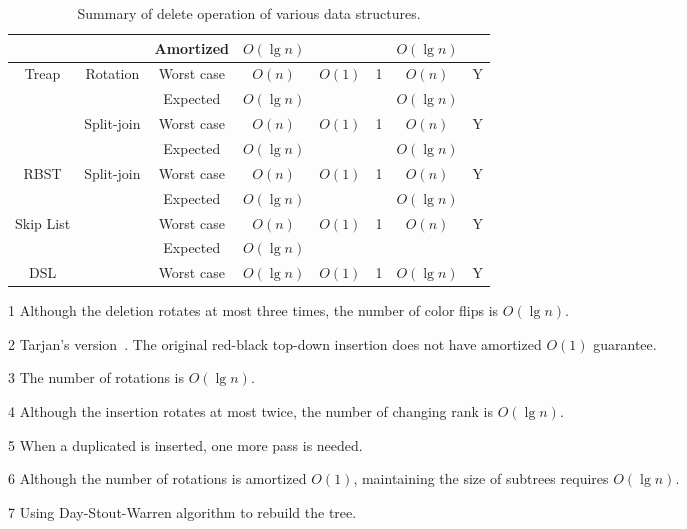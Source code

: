 \begin{table}[!t]
\begin{threeparttable}
\begin{tabular}{cccccccc}
  & & Amortized & $O(\lg n)$ & & & $O(\lg n)$ & \\
  \hline
  \multirow{4}{*}{Treap} & \multirow{2}{*}{Rotation} & Worst case & $O(n)$ & \multirow{2}{*}{$O(1)$} & \multirow{2}{*}{1} & $O(n)$ & \multirow{2}{*}{Y} \\
  & & Expected & $O(\lg n)$ &  & & $O(\lg n)$ & \\
  & \multirow{2}{*}{Split-join} & Worst case & $O(n)$ & \multirow{2}{*}{$O(1)$} & \multirow{2}{*}{1} & $O(n)$ & \multirow{2}{*}{Y} \\
  & & Expected & $O(\lg n)$ & & & $O(\lg n)$ & \\
  \hline
  \multirow{2}{*}{RBST} & \multirow{2}{*}{Split-join}& Worst case & $O(n)$ & \multirow{2}{*}{$O(1)$} & \multirow{2}{*}{1} & $O(n)$ & \multirow{2}{*}{Y} \\
  & & Expected & $O(\lg n)$ &  & & $O(\lg n)$ & \\
  \hline
  \multirow{2}{*}{Skip List} & & Worst case & $O(n)$ & \multirow{2}{*}{$O(1)$} & \multirow{2}{*}{1} & \multirow{2}{*}{$O(n)$} & \multirow{2}{*}{Y} \\
  & & Expected & $O(\lg n)$ & & & & \\
  \hline
  DSL & & Worst case & $O(\lg n)$ & $O(1)$ & 1 & $O(\lg n)$ & Y \\
\end{tabular}
\begin{tablenotes}\footnotesize
\item[1] Although the deletion rotates at most three times, the number of color flips is $O(\lg n)$.
\item[2] Tarjan's version~\cite{Tarjan1985}. The original red-black top-down insertion does not have amortized $O(1)$ guarantee.
\item[3] The number of rotations is $O(\lg n)$.
\item[4] Although the insertion rotates at most twice, the number of changing rank is $O(\lg n)$.
\item[5] When a duplicated is inserted, one more pass is needed.
\item[6] Although the number of rotations is amortized $O(1)$, maintaining the size of subtrees requires $O(\lg n)$.
\item[7] Using Day-Stout-Warren algorithm to rebuild the tree.
\end{tablenotes}
\caption{Summary of delete operation of various data structures.}\label{delete}
\end{threeparttable}
\end{table}

\printbibliography[heading=subbibliography]